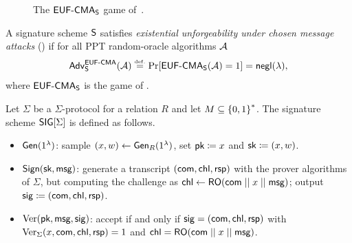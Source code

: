 \begin{figure}[htb]
    \centering
    \begin{pchstack}
        \pchspace
        \procedure[linenumbering]{$\OSign(\msg)$}{
            \sig \gets \Sign(\sk, \msg) \\
            \Qset \coloneqq \Qset \cup \set{\msg} \\
            \pcreturn \sig
        }
    \end{pchstack}
    \caption{The $\mathsf{EUF}\text{-}\mathsf{CMA}_{\mathsf{S}}$ game of~\cite[Game~2]{C:ABDPW25}.}\label{fig:eufcma}
\end{figure}

\begin{definition}\label{def:eufcma}
    A signature scheme $\mathsf{S}$ satisfies \emph{existential unforgeability
    under chosen message attacks} (\EUFCMA) if for all PPT random-oracle
    algorithms $\mathcal{A}$
    \begin{equation}
        \mathsf{Adv}^{\mathsf{EUF}\text{-}\mathsf{CMA}}_{\mathsf{S}}(\mathcal{A}) \overset{\scriptscriptstyle\mathrm{def.}}{=}
        \Pr[\mathsf{EUF}\text{-}\mathsf{CMA}_{\mathsf{S}}(\mathcal{A}) = 1] = \mathsf{negl}(\lambda),
    \end{equation}
    where $\mathsf{EUF}\text{-}\mathsf{CMA}_{\mathsf{S}}$ is the game of .
\end{definition}

\begin{definition}\label{def:fs}
    Let $\Sigma$ be a $\Sigma$-protocol for a relation $R$ and let $M \subseteq
    \left\{0,1\right\}^*$.
    The signature scheme $\mathsf{SIG}[\Sigma]$ is defined as follows.
    \begin{itemize}
        \item $\operatorname{\mathsf{Gen}}(1^{\lambda})$: sample $(x,w) \gets \operatorname{\mathsf{Gen}}_R(1^{\lambda})$, set $\textsf{pk}
            \coloneqq x$ and $\textsf{sk} \coloneqq (x,w)$.
        \item $\mathsf{Sign}(\textsf{sk}, \textsf{msg})$: generate a transcript $(\mathsf{com}, \mathsf{chl}, \mathsf{rsp})$
            with the prover algorithms of $\Sigma$, but computing the challenge
            as $\mathsf{chl} \gets \mathsf{RO}(\mathsf{com} \mathrel{||} x \mathrel{||} \textsf{msg})$; output $\mathsf{sig}
            \coloneqq (\mathsf{com}, \mathsf{chl}, \mathsf{rsp})$.
        \item $\operatorname{Ver}(\textsf{pk}, \textsf{msg}, \mathsf{sig})$: accept if and only if $\mathsf{sig} = (\mathsf{com},
            \mathsf{chl}, \mathsf{rsp})$ with $\operatorname{Ver}_\Sigma(x, \mathsf{com}, \mathsf{chl}, \mathsf{rsp}) = 1$ and
            $\mathsf{chl} = \mathsf{RO}(\mathsf{com} \mathrel{||} x \mathrel{||} \textsf{msg})$.
    \end{itemize}
\end{definition}

